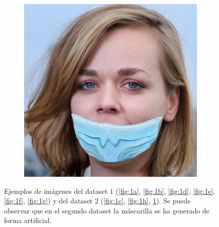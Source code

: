 \begin{figure}[htp]
	\begin{subfigure}{0.2\linewidth}
		\includegraphics[width=\linewidth]{imagenes/dataset1-9.jpg}
		\caption{}
		\label{fig:1i}
	\end{subfigure}
	\caption[Ejemplos de imágenes del dataset 1 y del dataset 2]{Ejemplos de imágenes del dataset 1 (\ref{fig:1a}, \ref{fig:1b}, \ref{fig:1d}, \ref{fig:1e}, \ref{fig:1f}, \ref{fig:1g}) y del dataset 2 (\ref{fig:1c}, \ref{fig:1h}, \ref{fig:1i}). Se puede observar que en el segundo dataset la máscarilla se ha generado de forma artificial.}
	\label{fig:1}
\end{figure}


